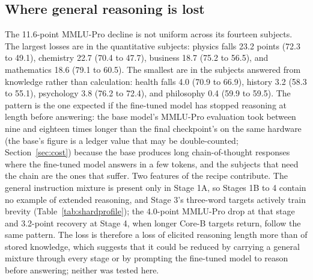 \documentclass[preprint,12pt,authoryear]{elsarticle}
\begin{document}
\subsection{Where general reasoning is lost}\label{sec:mmlu}
The 11.6-point MMLU-Pro decline is not uniform across its fourteen subjects. The largest losses are in the quantitative subjects: physics falls 23.2 points (72.3 to 49.1), chemistry 22.7 (70.4 to 47.7), business 18.7 (75.2 to 56.5), and mathematics 18.6 (79.1 to 60.5). The smallest are in the subjects answered from knowledge rather than calculation: health falls 4.0 (70.9 to 66.9), history 3.2 (58.3 to 55.1), psychology 3.8 (76.2 to 72.4), and philosophy 0.4 (59.9 to 59.5). The pattern is the one expected if the fine-tuned model has stopped reasoning at length before answering: the base model's MMLU-Pro evaluation took between nine and eighteen times longer than the final checkpoint's on the same hardware (the base's figure is a ledger value that may be double-counted; Section~\ref{sec:cost}) because the base produces long chain-of-thought responses where the fine-tuned model answers in a few tokens, and the subjects that need the chain are the ones that suffer. Two features of the recipe contribute. The general instruction mixture is present only in Stage 1A, so Stages 1B to 4 contain no example of extended reasoning, and Stage 3's three-word targets actively train brevity (Table~\ref{tab:shardprofile}); the 4.0-point MMLU-Pro drop at that stage and 3.2-point recovery at Stage 4, when longer Core-B targets return, follow the same pattern. The loss is therefore a loss of elicited reasoning length more than of stored knowledge, which suggests that it could be reduced by carrying a general mixture through every stage or by prompting the fine-tuned model to reason before answering; neither was tested here.
\end{document}

